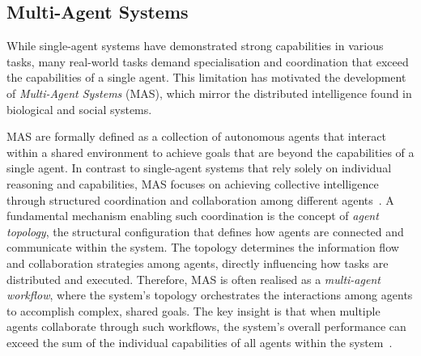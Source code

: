 \documentclass[]{selfevolagent}
\theoremstyle{plain}
\theoremstyle{definition}
\theoremstyle{remark}
\begin{document}
\subsection{Multi-Agent Systems}
\label{subsec:mas}
While single-agent systems have demonstrated strong capabilities in various tasks, many real-world tasks demand specialisation and coordination that exceed the capabilities of a single agent. This limitation has motivated the development of \textit{Multi-Agent Systems} (MAS), which mirror the distributed intelligence found in biological and social systems.

MAS are formally defined as a collection of autonomous agents that interact within a shared environment to achieve goals that are beyond the capabilities of a single agent.
In contrast to single-agent systems that rely solely on individual reasoning and capabilities, MAS focuses on achieving collective intelligence through structured coordination and collaboration among different agents~\citep{tran2025multi}. A fundamental mechanism enabling such coordination is the concept of \textit{agent topology}, the structural configuration that defines how agents are connected and communicate within the system. The topology determines the information flow and collaboration strategies among agents, directly influencing how tasks are distributed and executed. Therefore, MAS is often realised as a \textit{multi-agent workflow}, where the system's topology orchestrates the interactions among agents to accomplish complex, shared goals. 
The key insight is that when multiple agents collaborate through such workflows, the system's overall performance can exceed the sum of the individual capabilities of all agents within the system~\citep{lin2025creativityllmbasedmultiagentsystems,luo2025large}.
\end{document}
